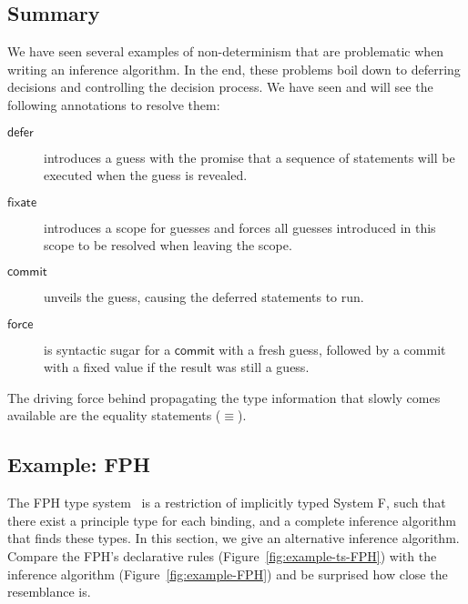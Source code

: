 \documentclass[preprint,natbib]{sigplanconf}
\newcommand\Defer{\mathsf{defer}}
\newcommand\Fixate{\mathsf{fixate}}
\newcommand\Commit{\mathsf{commit}}
\newcommand\Force{\mathsf{force}}
\begin{document}
    \subsection{Summary} We have seen several examples of
    non-determinism that are problematic when writing an inference
    algorithm. In the end, these problems boil down to deferring
    decisions and controlling the decision process. We have seen and
    will see the following annotations to resolve them:

    \begin{description}
    \item [$\Defer$] introduces a guess with the promise that a sequence of statements will
       be executed when the guess is revealed.
    \item [$\Fixate$] introduces a scope for guesses and forces all guesses introduced in this
       scope to be resolved when leaving the scope.
    \item [$\Commit$] unveils the guess, causing the deferred statements to run.
    \item [$\Force$] is syntactic sugar for a $\Commit$ with a fresh guess, followed by a
      commit with a fixed value if the result was still a guess.
    \end{description}
    The driving force behind propagating the type information that slowly comes available are
    the equality statements ($\equiv$).

  \subsection{Example: FPH}
  \label{sect:example-fph}

    The FPH type system~\cite{DBLP:conf/icfp/VytiniotisWJ08} is a restriction of implicitly typed System F, such that there exist a principle
    type for each binding, and a complete inference algorithm that finds these types. In this section, we give an alternative inference
    algorithm. Compare the FPH's declarative rules (Figure~\ref{fig:example-ts-FPH}) with the inference algorithm (Figure~\ref{fig:example-FPH})
    and be surprised how close the resemblance is.
\end{document}
